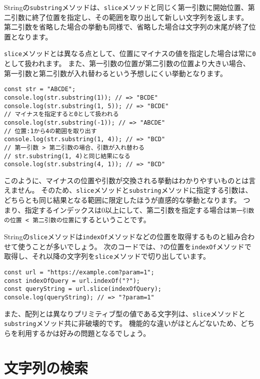 Stringの\texttt{substring}メソッドは、\texttt{slice}メソッドと同じく第一引数に開始位置、第二引数に終了位置を指定し、その範囲を取り出して新しい文字列を返します。
第二引数を省略した場合の挙動も同様で、省略した場合は文字列の末尾が終了位置となります。

\texttt{slice}メソッドとは異なる点として、位置にマイナスの値を指定した場合は常に\texttt{0}として扱われます。
また、第一引数の位置が第二引数の位置より大きい場合、第一引数と第二引数が入れ替わるという予想しにくい挙動となります。

\enlargethispage{\baselineskip}\begin{lstlisting}
const str = "ABCDE";
console.log(str.substring(1)); // => "BCDE"
console.log(str.substring(1, 5)); // => "BCDE"
// マイナスを指定すると0として扱われる
console.log(str.substring(-1)); // => "ABCDE"
// 位置:1から4の範囲を取り出す
console.log(str.substring(1, 4)); // => "BCD"
// 第一引数 > 第二引数の場合、引数が入れ替わる
// str.substring(1, 4)と同じ結果になる
console.log(str.substring(4, 1)); // => "BCD"
\end{lstlisting}

このように、マイナスの位置や引数が交換される挙動はわかりやすいものとは言えません。
そのため、\texttt{slice}メソッドと\texttt{substring}メソッドに指定する引数は、どちらとも同じ結果となる範囲に限定したほうが直感的な挙動となります。
つまり、指定するインデックスは0以上にして、第二引数を指定する場合は\texttt{第一引数の位置 < 第二引数の位置}にするということです。

Stringの\texttt{slice}メソッドは\texttt{indexOf}メソッドなどの位置を取得するものと組み合わせて使うことが多いでしょう。
次のコードでは、\texttt{?}の位置を\texttt{indexOf}メソッドで取得し、それ以降の文字列を\texttt{slice}メソッドで切り出しています。

\begin{lstlisting}
const url = "https://example.com?param=1";
const indexOfQuery = url.indexOf("?");
const queryString = url.slice(indexOfQuery);
console.log(queryString); // => "?param=1"
\end{lstlisting}

また、配列とは異なりプリミティブ型の値である文字列は、\texttt{slice}メソッドと\texttt{substring}メソッド共に非破壊的です。
機能的な違いがほとんどないため、どちらを利用するかは好みの問題となるでしょう。

\hypertarget{search}{%
\section{文字列の検索}\label{search}}

